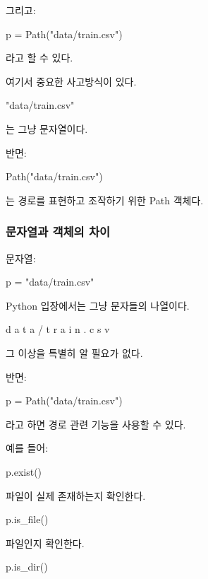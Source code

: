 그리고:

\begin{dhkcode}
p = Path("data/train.csv")
\end{dhkcode}

라고 할 수 있다.

여기서 중요한 사고방식이 있다.

\begin{dhkzsh}
"data/train.csv"
\end{dhkzsh}

는 그냥 문자열이다.

반면:

\begin{dhkcode}
Path("data/train.csv")
\end{dhkcode}

는 경로를 표현하고 조작하기 위한 Path 객체다.

\subsubsection{문자열과  객체의 차이}

문자열:

\begin{dhkcode}
p = "data/train.csv"
\end{dhkcode}

Python 입장에서는 그냥 문자들의 나열이다.

\begin{dhkzsh}
    d a t a / t r a i n . c s v
\end{dhkzsh}

그 이상을 특별히 알 필요가 없다.

반면:

\begin{dhkcode}
p = Path("data/train.csv")
\end{dhkcode}

라고 하면 경로 관련 기능을 사용할 수 있다.

예를 들어:

\begin{dhkcode}
p.exist()
\end{dhkcode}

파일이 실제 존재하는지 확인한다.

\begin{dhkcode}
p.is_file()
\end{dhkcode}

파일인지 확인한다.

\begin{dhkcode}
p.is_dir()
\end{dhkcode}

